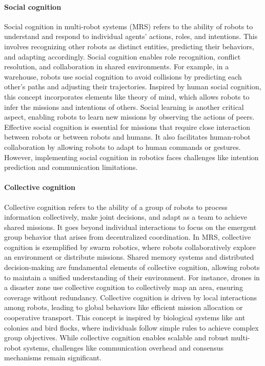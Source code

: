 \documentclass{book}
\begin{document}
\paragraph{Social cognition}
Social cognition in multi-robot systems (MRS) refers to the ability of robots to understand and respond to individual agents’ actions, roles, and intentions. This involves recognizing other robots as distinct entities, predicting their behaviors, and adapting accordingly. Social cognition enables role recognition, conflict resolution, and collaboration in shared environments. For example, in a warehouse, robots use social cognition to avoid collisions by predicting each other’s paths and adjusting their trajectories. Inspired by human social cognition, this concept incorporates elements like theory of mind, which allows robots to infer the missions and intentions of others. Social learning is another critical aspect, enabling robots to learn new missions by observing the actions of peers. Effective social cognition is essential for missions that require close interaction between robots or between robots and humans. It also facilitates human-robot collaboration by allowing robots to adapt to human commands or gestures. However, implementing social cognition in robotics faces challenges like intention prediction and communication limitations.


\paragraph{Collective cognition}
Collective cognition refers to the ability of a group of robots to process information collectively, make joint decisions, and adapt as a team to achieve shared missions. It goes beyond individual interactions to focus on the emergent group behavior that arises from decentralized coordination. In MRS, collective cognition is exemplified by swarm robotics, where robots collaboratively explore an environment or distribute missions. Shared memory systems and distributed decision-making are fundamental elements of collective cognition, allowing robots to maintain a unified understanding of their environment. For instance, drones in a disaster zone use collective cognition to collectively map an area, ensuring coverage without redundancy. Collective cognition is driven by local interactions among robots, leading to global behaviors like efficient mission allocation or cooperative transport. This concept is inspired by biological systems like ant colonies and bird flocks, where individuals follow simple rules to achieve complex group objectives. While collective cognition enables scalable and robust multi-robot systems, challenges like communication overhead and consensus mechanisms remain significant.
\end{document}
